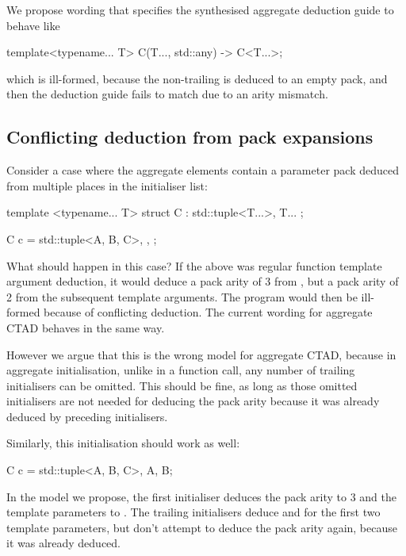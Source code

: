 We propose wording that specifies the synthesised aggregate deduction guide to behave like

\begin{codeblock}
template<typename... T> 
C(T..., std::any) -> C<T...>;
\end{codeblock}

which is ill-formed, because the non-trailing  is deduced to an empty pack, and then the deduction guide fails to match due to an arity mismatch.

\subsection{Conflicting deduction from pack expansions}

Consider a case where the aggregate elements contain a parameter pack deduced from multiple places in the initialiser list:

\begin{codeblock}
template <typename... T> 
struct C : std::tuple<T...>, T... {};

C c = {std::tuple<A, B, C>{}, {}, {}};
\end{codeblock}

What should happen in this case? If the above was regular function template argument deduction, it would deduce a pack arity of 3 from , but a pack arity of 2 from the subsequent template arguments. The program would then be ill-formed because of conflicting deduction. The current wording for aggregate CTAD behaves in the same way.

However we argue that this is the wrong model for aggregate CTAD, because in aggregate initialisation, unlike in a function call, any number of trailing initialisers can be omitted. This should be fine, as long as those omitted initialisers are not needed for deducing the pack arity because it was already deduced by preceding initialisers.

Similarly, this initialisation should work as well:

\begin{codeblock}
C c = {std::tuple<A, B, C>{}, A{}, B{}};
\end{codeblock}

In the model we propose, the first initialiser deduces the pack arity to 3 and the template parameters to . The trailing initialisers deduce  and  for the first two template parameters, but don't attempt to deduce the pack arity again, because it was already deduced.


